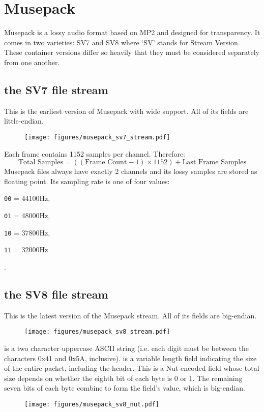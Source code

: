 
\chapter{Musepack}
Musepack is a lossy audio format based on MP2 and designed for
transparency.
It comes in two varieties: SV7 and SV8 where `SV' stands for
Stream Version.
These container versions differ so heavily that they must be
considered separately from one another.
\section{the SV7 file stream}
This is the earliest version of Musepack with wide support.
All of its fields are little-endian.
\begin{figure}[h]
\texttt{[image: figures/musepack\_sv7\_stream.pdf]}
\end{figure}
Each frame contains 1152 samples per channel.
Therefore:
\begin{equation}
\text{Total Samples} = ((\text{Frame Count} - 1) \times 1152) + \text{Last Frame Samples}
\end{equation}
Musepack files always have exactly 2 channels and its lossy samples
are stored as floating point.
Its sampling rate is one of four values:

\begin{inparaenum}
\item[\texttt{00} = ] 44100Hz,
\item[\texttt{01} = ] 48000Hz,
\item[\texttt{10} = ] 37800Hz,
\item[\texttt{11} = ] 32000Hz
\end{inparaenum}
.

\pagebreak

\section{the SV8 file stream}
This is the latest version of the Musepack stream.
All of its fields are big-endian.
\begin{figure}[h]
\texttt{[image: figures/musepack\_sv8\_stream.pdf]}
\end{figure}
\par
\noindent
{} is a two character uppercase ASCII string
(i.e. each digit must be between the characters 0x41 and 0x5A, inclusive).
 is a variable length field indicating the size of the entire packet,
including the header.
This is a Nut-encoded field whose total size depends on whether
the eighth bit of each byte is 0 or 1.
The remaining seven bits of each byte combine to form the field's value,
which is big-endian.
\begin{figure}[h]
\texttt{[image: figures/musepack\_sv8\_nut.pdf]}
\end{figure}

